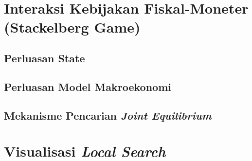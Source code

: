 \section{Interaksi Kebijakan Fiskal-Moneter (Stackelberg Game)}
\subsection{Perluasan State}
\subsection{Perluasan Model Makroekonomi}
\subsection{Mekanisme Pencarian \textit{Joint Equilibrium}}
\section{Visualisasi \textit{Local Search}}
